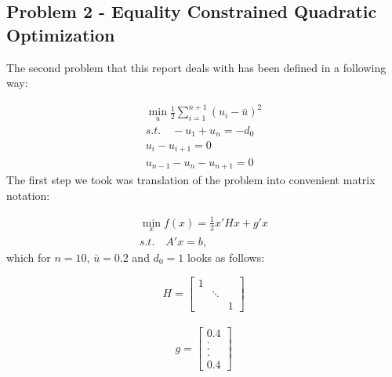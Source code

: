 \newpage
\subsection{Problem 2 - Equality Constrained Quadratic Optimization}

The second problem that this report deals with has been defined in a following way:

\begin{equation}
\begin{split}
\min_{u} \frac{1}{2} \sum_{i=1}^{n+1} (u_i - \bar{u})^2\\
s.t. \quad -u_1 + u_n = - d_0\\
u_i - u_{i+1} = 0\\
u_{n-1} - u_n - u_{n+1} = 0
\end{split}
\end{equation}
The first step we took was translation of the problem into convenient matrix notation:

\begin{equation}
\begin{split}
\min_{x} f(x) = \frac{1}{2} x'Hx + g'x\\
s.t. \quad A'x = b,
\end{split}
\end{equation}
which for $n=10$, $\bar{u} = 0.2$ and $d_0=1$ looks as follows:

\[
  H =
  \begin{bmatrix}
    1& & \\
    & \ddots & \\
    & &1
  \end{bmatrix}
\]\\

\[g=\begin{bmatrix}
	0.4 \\ . \\ . \\ . \\ 0.4
\end{bmatrix}\]\\
     
